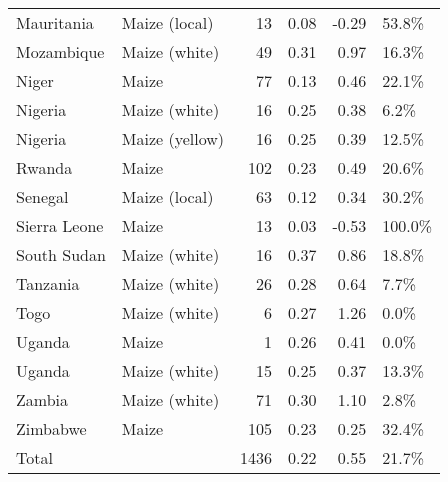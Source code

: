 \begin{table}[ht]
\begin{tabular}{llrrrl}
  Mauritania & Maize (local) &  13 & 0.08 & -0.29 & 53.8\% \\ 
  Mozambique & Maize (white) &  49 & 0.31 & 0.97 & 16.3\% \\ 
  Niger & Maize &  77 & 0.13 & 0.46 & 22.1\% \\ 
  Nigeria & Maize (white) &  16 & 0.25 & 0.38 & 6.2\% \\ 
  Nigeria & Maize (yellow) &  16 & 0.25 & 0.39 & 12.5\% \\ 
  Rwanda & Maize & 102 & 0.23 & 0.49 & 20.6\% \\ 
  Senegal & Maize (local) &  63 & 0.12 & 0.34 & 30.2\% \\ 
  Sierra Leone & Maize &  13 & 0.03 & -0.53 & 100.0\% \\ 
  South Sudan & Maize (white) &  16 & 0.37 & 0.86 & 18.8\% \\ 
  Tanzania & Maize (white) &  26 & 0.28 & 0.64 & 7.7\% \\ 
  Togo & Maize (white) &   6 & 0.27 & 1.26 & 0.0\% \\ 
  Uganda & Maize &   1 & 0.26 & 0.41 & 0.0\% \\ 
  Uganda & Maize (white) &  15 & 0.25 & 0.37 & 13.3\% \\ 
  Zambia & Maize (white) &  71 & 0.30 & 1.10 & 2.8\% \\ 
  Zimbabwe & Maize & 105 & 0.23 & 0.25 & 32.4\% \\ 
  Total &  & 1436 & 0.22 & 0.55 & 21.7\% \\ 
   \hline
\end{tabular}
\end{table}
